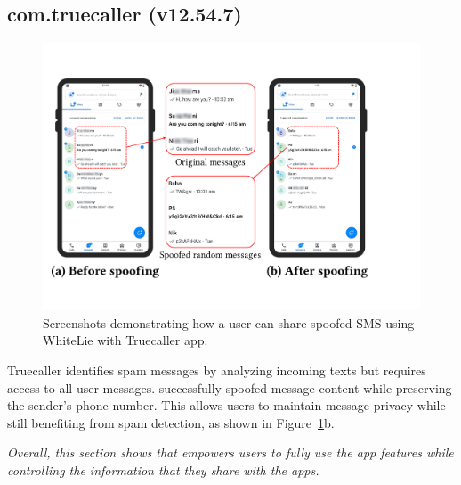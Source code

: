 \subsection{com.truecaller (v12.54.7)}

\label{sec:tc_case_study}

\begin{figure}[b!]
    \centering
    \includegraphics[width=0.75\linewidth]{Figures/Case Studies/truecaller_screenshots.pdf}
    \caption{Screenshots demonstrating how a user can share spoofed SMS using WhiteLie with Truecaller app.}
    \label{fig:case-study-truecaller}
\end{figure}

Truecaller identifies spam messages by analyzing incoming texts but requires access to all user messages. \framework{} successfully spoofed message content while preserving the sender's phone number. This allows users to maintain message privacy while still benefiting from spam detection, as shown in Figure~\ref{fig:case-study-truecaller}b.


\textit{Overall, this section shows that \framework{} empowers users to fully use the app features while controlling the information that they share with the apps.}
